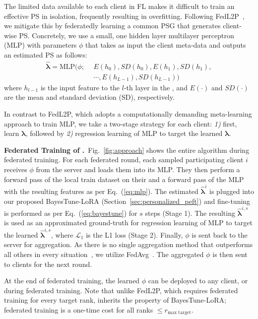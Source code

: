 The limited data available to each client in FL makes it difficult to train an effective PS in isolation, frequently resulting in overfitting. Following FedL2P~\cite{royson2023fedl2p}, we mitigate this by federatedly learning a common PSG that generates client-wise PS. Concretely, we use a small, one hidden layer multilayer perceptron (MLP) with parameters $\phi$ that takes as input the client meta-data and outputs an estimated PS as follows:
% 
\begin{align}\label{eq:mlp}
\bm{\hat{\lambda}} = \text{MLP}(\phi; \:\: &E(h_0),SD(h_0),E(h_1),SD(h_1), \nonumber \\
&\cdots,E(h_{L-1}),SD(h_{L-1}))
\end{align}
where $h_{l-1}$ is the input feature to the $l$-th layer in the \basemodel{}, and $E(\cdot)$ and $SD(\cdot)$ are the mean and standard deviation (SD), respectively.

In contrast to FedL2P, which adopts a computationally demanding meta-learning approach to train MLP, we take a two-stage strategy for each client: \textit{1)} first, learn $\bm{\lambda}$, followed by \textit{2)} regression learning of MLP to target the learned $\bm{\lambda}$. 

\noindent\textbf{Federated Training of \method{}.}~Fig.~\ref{fig:approach} shows the entire \method{} algorithm during federated training. For each federated round, each sampled participating client $i$ receives $\phi$ from the server and loads them into its MLP. They then  perform a forward pass of the local train dataset on their \basemodel{} and a forward pass of the MLP with the resulting features as per Eq.~(\ref{eq:mlp}).  The estimated $\bm{\hat{\lambda}}^i$ is plugged into our proposed BayesTune-LoRA (Section~\ref{sec:personalized_peft}) and  fine-tuning is performed as per Eq.~(\ref{eq:bayestune}) for $s$ steps (Stage 1).  The resulting $\hat{\bm{\lambda}}^{i,s}$
is used as an approximated ground-truth for regression learning of MLP to target the learned $\hat{\bm{\lambda}}^{i,s}$, where $\mathcal{L}_1$ is the L1 loss (Stage 2). Finally,  $\phi$ is sent back to the server for aggregation. As there is no single aggregation method that outperforms all others in every situation~\cite{matsuda2022empirical,chen2022pfl,fedllm-bench}, we utilize FedAvg~\cite{fedavg}. The aggregated $\phi$ is then sent to clients for the next round.

At the end of federated training, the learned $\phi$ can be deployed to any client, \seen{} or \unseen{} during federated training. Note that unlike FedL2P, which requires federated training for every target rank, \method{} inherits the property of BayesTune-LoRA; federated training is a one-time cost for all ranks $\leq r_{\text{max target}}$.

